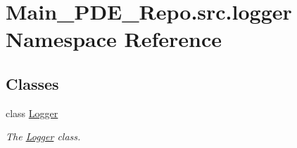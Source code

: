 \hypertarget{namespaceMain__PDE__Repo_1_1src_1_1logger}{}\section{Main\+\_\+\+P\+D\+E\+\_\+\+Repo.\+src.\+logger Namespace Reference}
\label{namespaceMain__PDE__Repo_1_1src_1_1logger}
\subsection*{Classes}
\begin{DoxyCompactItemize}
\item 
class \hyperlink{classMain__PDE__Repo_1_1src_1_1logger_1_1Logger}{Logger}
\begin{DoxyCompactList}\small\item\em The \hyperlink{classMain__PDE__Repo_1_1src_1_1logger_1_1Logger}{Logger} class. \end{DoxyCompactList}\end{DoxyCompactItemize}
